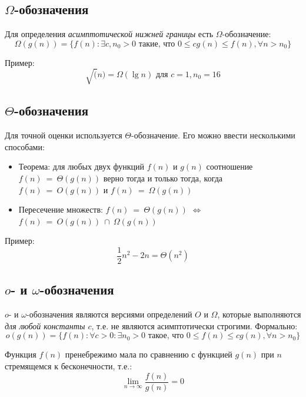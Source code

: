 \documentclass[a4paper,11pt]{article}
\begin{document}
\subsection{$\Omega$-обозначения}

Для определения \emph{асимптотической нижней границы} есть $\Omega$-обозначение:
\begin{equation*}
  \Omega(g(n)) = \{f(n): \exists c, n_0 > 0 \text{ такие, что }
  0 \leqslant c g(n) \leqslant f(n), \forall n > n_0
  \}
\end{equation*}

Пример:
\begin{equation*}
  \sqrt(n) = \Omega(\lg n) \text{ для } c = 1, n_0 = 16
\end{equation*}

\subsection{$\Theta$-обозначения}

Для точной оценки используется $\Theta$-обозначение. Его можно ввести
несколькими способами:
\begin{itemize}
\item Теорема: для любых двух функций $f(n)$ и $g(n)$ соотношение
  $f(n)~=~\Theta(g(n))$ верно тогда и только тогда, когда $f(n)~=~O(g(n))$ и
  $f(n)~=~\Omega(g(n))$
\item Пересечение множеств: 
  $f(n)~=~\Theta(g(n))$ $\iff$ $f(n)~=~O(g(n))~\cap~\Omega(g(n))$
\end{itemize}

Пример:
\begin{equation*}
  \frac{1}{2}n^2 - 2n = \Theta(n^2)
\end{equation*}

\subsection{$o$- и $\omega$-обозначения}

$o$- и $\omega$-обозначения являются версиями определений $O$ и $\Omega$,
которые выполняются \emph{для любой константы $c$}, т.е. не являются
асимптотически строгими. Формально:
\begin{equation*}
  o(g(n)) = \{f(n): \forall c > 0: \exists n_0 > 0 \text{ такое, что }
  0 \leqslant f(n) \leqslant c g(n), \forall n > n_0
  \}
\end{equation*}

Функция $f(n)$ пренебрежимо мала по сравнению с функцией $g(n)$ при $n$
стремящемся к бесконечности, т.е.: 
\begin{equation*}
  \lim_{n\to\infty}\frac{f(n)}{g(n)} = 0
\end{equation*}
\end{document}
